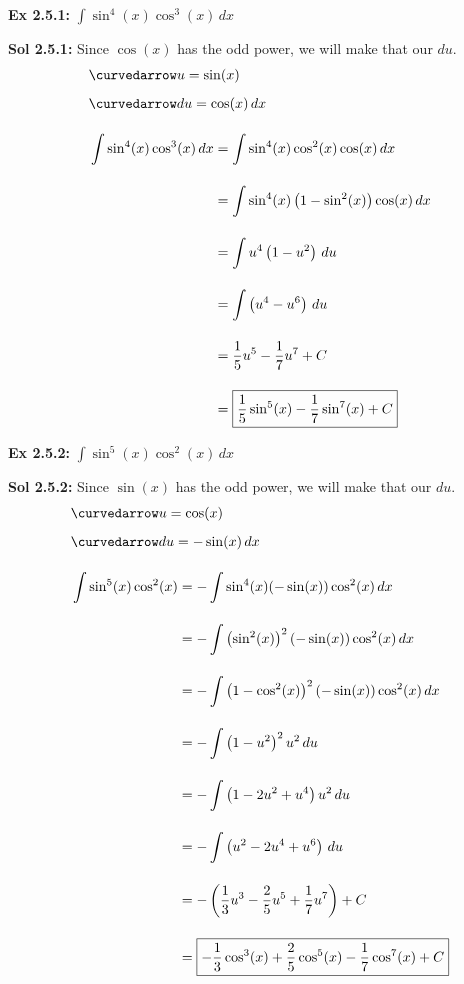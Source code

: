 \begin{tcolorbox}[example]
    \textbf{Ex 2.5.1: } $\int \sin^4 (x)\cos^3 (x) \, dx$
\end{tcolorbox}
\begin{tcolorbox}[solution]
    \textbf{Sol 2.5.1: } Since $\cos (x)$ has the odd power, we will make that our $du$. \begin{align*}
        & \curvedarrow u = \sin (x) \\[5.5pt]
        & \curvedarrow du = \cos (x) \, dx \\[11pt]
        & \int \sin^4 (x)\cos^3 (x) \, dx \begin{aligned}[t]
            & = \int \sin^4 (x)\cos^2 (x)\cos (x) \, dx \\[11pt]
            & = \int \sin^4 (x)\left(1 - \sin^2 (x)\right)\cos (x) \, dx \\[11pt]
            & = \int u^4\left(1 - u^2\right) \, du \\[11pt]
            & = \int \left(u^4 - u^6\right) \, du \\[11pt]
            & = \dfrac{1}{5}u^5 - \dfrac{1}{7}u^7 + C \\[11pt]
            & = \boxed{\dfrac{1}{5}\sin^5 (x) - \dfrac{1}{7}\sin^7 (x) + C}
        \end{aligned}
    \end{align*}
\end{tcolorbox} \vspace{11pt}

\begin{tcolorbox}[example]
    \textbf{Ex 2.5.2: } $\int \sin^5 (x)\cos^2 (x) \, dx$
\end{tcolorbox}
\begin{tcolorbox}[solution]
    \textbf{Sol 2.5.2: } Since $\sin (x)$ has the odd power, we will make that our $du$. \begin{align*}
        & \curvedarrow u = \cos (x) \\[5.5pt]
        & \curvedarrow du = -\sin (x) \, dx \\[11pt]
        & \int \sin^5 (x)\cos^2 (x) \begin{aligned}[t]
            & = -\int \sin^4 (x)(-\sin (x))\cos^2 (x) \, dx \\[11pt]
            & = -\int \left(\sin^2 (x)\right)^2(-\sin (x))\cos^2 (x) \, dx \\[11pt]
            & = -\int \left(1 - \cos^2 (x)\right)^2(-\sin (x))\cos^2 (x) \, dx \\[11pt]
            & = -\int \left(1 - u^2\right)^2u^2 \, du \\[11pt]
            & = -\int \left(1 - 2u^2 + u^4\right)u^2 \, du \\[11pt]
            & = -\int \left(u^2 - 2u^4 + u^6\right) \, du \\[11pt]
            & = -\left(\dfrac{1}{3}u^3 - \dfrac{2}{5}u^5 + \dfrac{1}{7}u^7\right) + C \\[11pt]
            & = \boxed{-\dfrac{1}{3}\cos^3 (x) + \dfrac{2}{5}\cos^5 (x) - \dfrac{1}{7}\cos^7 (x) + C}
        \end{aligned}
    \end{align*}
\end{tcolorbox}

